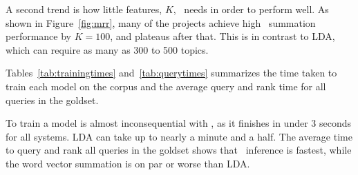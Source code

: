 A second trend is how little features, $K$, \dv\ needs in order to perform well.
As shown in Figure~\ref{fig:mrr}, many of the projects achieve high \dv\ 
summation performance by $K=100$, and plateaus after that. This is in contrast
to LDA, which can require as many as 300 to 500 topics.

Tables~\ref{tab:trainingtimes} and~\ref{tab:querytimes} summarizes the time taken
to train each model on the corpus and the average query and rank time for all
queries in the goldset.

To train a model is almost inconsequential with \dv, as it finishes in under
3 seconds for all systems. LDA can take up to nearly a minute and a half.
The average time to query and rank all queries in the goldset shows that \dv\ 
inference is fastest, while the word vector summation is on par or worse than
LDA.

